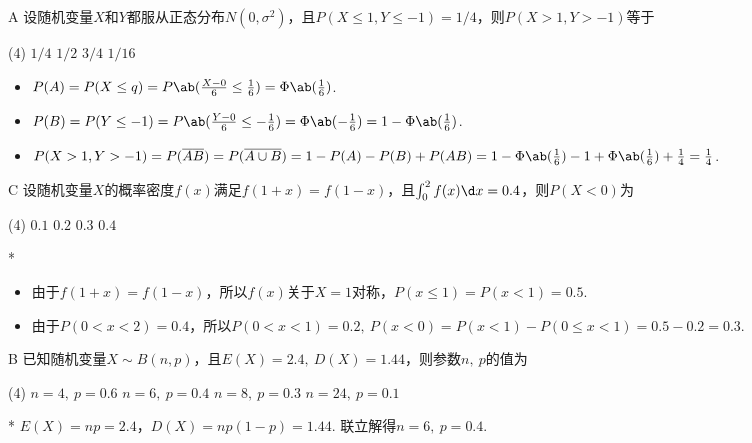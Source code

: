 \begin{choice}{A}
    设随机变量$X$和$Y$都服从正态分布$N(0,\sigma^2)$，且$P(X\leq 1,Y\leq -1)=1/4$，则$P(X>1,Y>-1)$等于
\begin{tasks}(4)
    \task $1/4$
    \task $1/2$
    \task $3/4$
    \task $1/16$
\end{tasks}
\end{choice}
\begin{solution}
\begin{itemize}
    \item $P(A)=P(X\leq q)=P\ab(\frac{X-0}{6}\leq\frac16)=\Phi\ab(\frac16)$.
    \item $P(B)=P(Y\leq -1)=P\ab(\frac{Y-0}{6}\leq-\frac16)=\Phi\ab(-\frac16)=1-\Phi\ab(\frac16)$.
    \item $P(X>1,Y>-1)=P(\overline{A}\overline{B})=P(\overline{A\cup B})=1-P(A)-P(B)+P(AB)=1-\Phi\ab(\frac16)-1+\Phi\ab(\frac16)+\frac14=\frac14$.
\end{itemize}
\end{solution}

\begin{choice}{C}
    设随机变量$X$的概率密度$f(x)$满足$f(1+x)=f(1-x)$，且$\int_0^2f(x)\d x=0.4$，则$P(X<0)$为
    \begin{tasks}(4)
        \task $0.1$
        \task $0.2$
        \task $0.3$
        \task $0.4$
    \end{tasks}
\end{choice}
\begin{solution}*
\begin{itemize}
    \item 由于$f(1+x)=f(1-x)$，所以$f(x)$关于$X=1$对称，$P(x\leq 1)=P(x<1)=0.5$.
    \item 由于$P(0<x<2)=0.4$，所以$P(0<x<1)=0.2,\ P(x<0)=P(x<1)-P(0\leq x<1)=0.5-0.2=0.3$. 
\end{itemize}
\end{solution}


\begin{choice}{B}
    已知随机变量$X\sim B(n,p)$，且$E(X)=2.4,\ D(X)=1.44$，则参数$n,\ p$的值为
\begin{tasks}(4)
    \task $n=4,\ p=0.6$
    \task $n=6,\ p=0.4$
    \task $n=8,\ p=0.3$
    \task $n=24,\ p=0.1$
\end{tasks}
\end{choice}
\begin{solution}*
    $E(X)=np=2.4$，$D(X)=np(1-p)=1.44$. 联立解得$n=6,\ p=0.4$. 
\end{solution}

